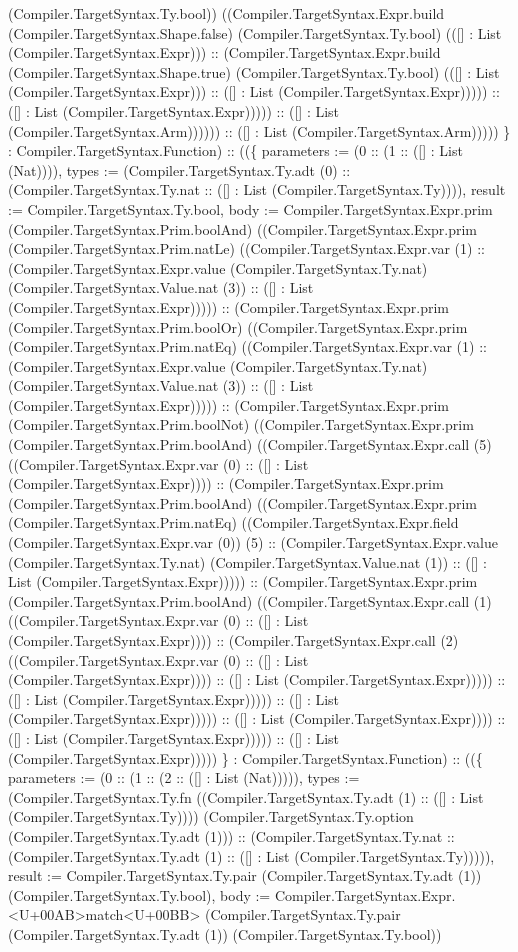 \documentclass[11pt]{article}
\begin{document}
(Compiler.TargetSyntax.Ty.bool)) ((Compiler.TargetSyntax.Expr.build (Compiler.TargetSyntax.Shape.false) (Compiler.TargetSyntax.Ty.bool) (([] : List (Compiler.TargetSyntax.Expr))) :: (Compiler.TargetSyntax.Expr.build (Compiler.TargetSyntax.Shape.true) (Compiler.TargetSyntax.Ty.bool) (([] : List (Compiler.TargetSyntax.Expr))) :: ([] : List (Compiler.TargetSyntax.Expr))))) :: ([] : List (Compiler.TargetSyntax.Expr))))) :: ([] : List (Compiler.TargetSyntax.Arm)))))) :: ([] : List (Compiler.TargetSyntax.Arm))))) \} : Compiler.TargetSyntax.Function) :: ((\{ parameters := (0 :: (1 :: ([] : List (Nat)))), types := (Compiler.TargetSyntax.Ty.adt (0) :: (Compiler.TargetSyntax.Ty.nat :: ([] : List (Compiler.TargetSyntax.Ty)))), result := Compiler.TargetSyntax.Ty.bool, body := Compiler.TargetSyntax.Expr.prim (Compiler.TargetSyntax.Prim.boolAnd) ((Compiler.TargetSyntax.Expr.prim (Compiler.TargetSyntax.Prim.natLe) ((Compiler.TargetSyntax.Expr.var (1) :: (Compiler.TargetSyntax.Expr.value (Compiler.TargetSyntax.Ty.nat) (Compiler.TargetSyntax.Value.nat (3)) :: ([] : List (Compiler.TargetSyntax.Expr))))) :: (Compiler.TargetSyntax.Expr.prim (Compiler.TargetSyntax.Prim.boolOr) ((Compiler.TargetSyntax.Expr.prim (Compiler.TargetSyntax.Prim.natEq) ((Compiler.TargetSyntax.Expr.var (1) :: (Compiler.TargetSyntax.Expr.value (Compiler.TargetSyntax.Ty.nat) (Compiler.TargetSyntax.Value.nat (3)) :: ([] : List (Compiler.TargetSyntax.Expr))))) :: (Compiler.TargetSyntax.Expr.prim (Compiler.TargetSyntax.Prim.boolNot) ((Compiler.TargetSyntax.Expr.prim (Compiler.TargetSyntax.Prim.boolAnd) ((Compiler.TargetSyntax.Expr.call (5) ((Compiler.TargetSyntax.Expr.var (0) :: ([] : List (Compiler.TargetSyntax.Expr)))) :: (Compiler.TargetSyntax.Expr.prim (Compiler.TargetSyntax.Prim.boolAnd) ((Compiler.TargetSyntax.Expr.prim (Compiler.TargetSyntax.Prim.natEq) ((Compiler.TargetSyntax.Expr.field (Compiler.TargetSyntax.Expr.var (0)) (5) :: (Compiler.TargetSyntax.Expr.value (Compiler.TargetSyntax.Ty.nat) (Compiler.TargetSyntax.Value.nat (1)) :: ([] : List (Compiler.TargetSyntax.Expr))))) :: (Compiler.TargetSyntax.Expr.prim (Compiler.TargetSyntax.Prim.boolAnd) ((Compiler.TargetSyntax.Expr.call (1) ((Compiler.TargetSyntax.Expr.var (0) :: ([] : List (Compiler.TargetSyntax.Expr)))) :: (Compiler.TargetSyntax.Expr.call (2) ((Compiler.TargetSyntax.Expr.var (0) :: ([] : List (Compiler.TargetSyntax.Expr)))) :: ([] : List (Compiler.TargetSyntax.Expr))))) :: ([] : List (Compiler.TargetSyntax.Expr))))) :: ([] : List (Compiler.TargetSyntax.Expr))))) :: ([] : List (Compiler.TargetSyntax.Expr)))) :: ([] : List (Compiler.TargetSyntax.Expr))))) :: ([] : List (Compiler.TargetSyntax.Expr))))) \} : Compiler.TargetSyntax.Function) :: ((\{ parameters := (0 :: (1 :: (2 :: ([] : List (Nat))))), types := (Compiler.TargetSyntax.Ty.fn ((Compiler.TargetSyntax.Ty.adt (1) :: ([] : List (Compiler.TargetSyntax.Ty)))) (Compiler.TargetSyntax.Ty.option (Compiler.TargetSyntax.Ty.adt (1))) :: (Compiler.TargetSyntax.Ty.nat :: (Compiler.TargetSyntax.Ty.adt (1) :: ([] : List (Compiler.TargetSyntax.Ty))))), result := Compiler.TargetSyntax.Ty.pair (Compiler.TargetSyntax.Ty.adt (1)) (Compiler.TargetSyntax.Ty.bool), body := Compiler.TargetSyntax.Expr.<U+00AB>match<U+00BB> (Compiler.TargetSyntax.Ty.pair (Compiler.TargetSyntax.Ty.adt (1)) (Compiler.TargetSyntax.Ty.bool)) 
\end{document}
